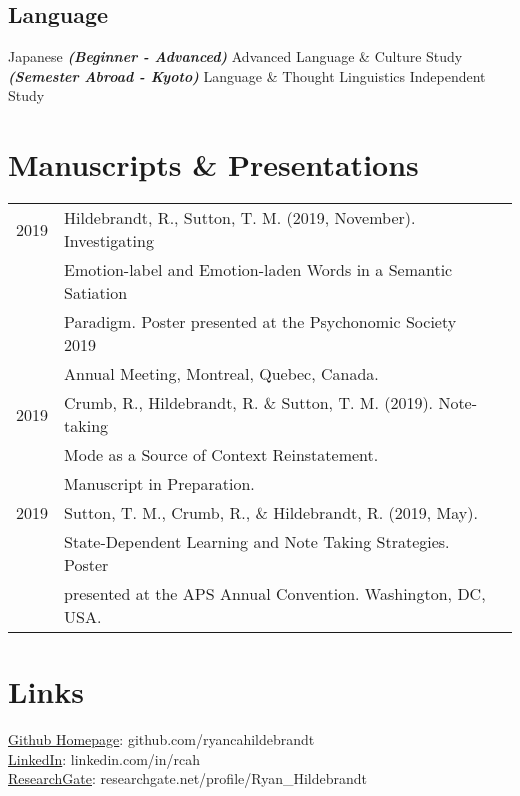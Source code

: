 \documentclass[letterpaper]{deedy-resume_sm} %
\begin{document}
\subsection{Language}
Japanese \textbullet{} 
{\footnotesize \textit{\textbf{(Beginner - Advanced)}}} \textbullet{} 
Advanced Language \& Culture Study \textbullet{} 
{\footnotesize \textit{\textbf{(Semester Abroad - Kyoto)}}} \textbullet{} 
Language \& Thought \textbullet{} 
Linguistics Independent Study \textbullet{} 
\sectionspace

\section{Manuscripts \& Presentations} 
\begin{tabular}{rll}
2019 & Hildebrandt, R., Sutton, T. M. (2019, November). Investigating \\
 & Emotion-label and Emotion-laden Words in a Semantic Satiation\\
 & Paradigm. Poster presented at the Psychonomic Society 2019\\ 
 & Annual Meeting, Montreal, Quebec, Canada. \\
2019 & Crumb, R., Hildebrandt, R. \& Sutton, T. M. (2019). Note-taking\\
 & Mode as a Source of Context Reinstatement.\\ 
 & Manuscript in Preparation.\\
2019 & Sutton, T. M., Crumb, R., \& Hildebrandt, R. (2019, May).\\ 
 & State-Dependent Learning and Note Taking Strategies. Poster\\ 
 & presented at the APS Annual Convention. Washington, DC, USA. \\
\end{tabular}
\sectionspace %

\section{Links} 
\href{https://github.com/ryancahildebrandt}{Github Homepage}: github.com/ryancahildebrandt \\
\href{https://linkedin.com/in/rcah}{LinkedIn}: linkedin.com/in/rcah \\
\href{https://researchgate.net/profile/Ryan\_Hildebrandt}{ResearchGate}: researchgate.net/profile/Ryan\_Hildebrandt 
\sectionspace %
\hfill
\end{document}
